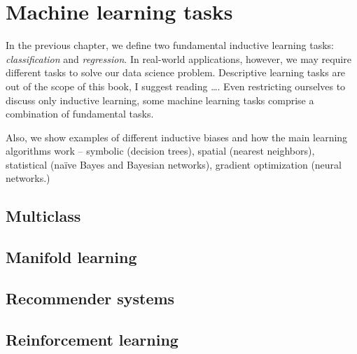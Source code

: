 \chapter{Machine learning tasks}

In the previous chapter, we define two fundamental inductive learning tasks:
\emph{classification} and \emph{regression}.  In real-world applications, however, we may
require different tasks to solve our data science problem.  Descriptive learning tasks are
out of the scope of this book, I suggest reading \dots. Even restricting ourselves to
discuss only inductive learning, some machine learning tasks comprise a combination of
fundamental tasks.

Also, we show examples of different inductive biases and how the main learning algorithms
work -- symbolic (decision trees), spatial (nearest neighbors), statistical (naïve Bayes
and Bayesian networks), gradient optimization (neural networks.)

\section{Multiclass}

\section{Manifold learning}

\section{Recommender systems}

\section{Reinforcement learning}
